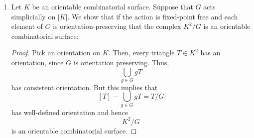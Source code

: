 \documentclass{book}
\begin{document}
\begin{enumerate}[(1)]
    \item Let $K$ be an orientable combinatorial surface. Suppose that $G$ acts simplicially on $|K|$. We show that if the action is fixed-point free and each element of $G$ is orientation-preserving that the complex $K^2/G$ is an orientable combinatorial surface:
        \begin{proof} Pick an orientation on $K$. Then, every triangle $T \in K^2$ has an orientation, since $G$ is orientation preserving. Thus, 
            \[\bigcup_{g \in G} gT\]
            has consistent orientation. But this implies that 
            \[[T] - \bigcup_{g \in G} gT = T/G\]
            has well-defined orientation and hence 
            \[K^2/G\]
            is an orientable combinatorial surface. 
        \end{proof}
\end{enumerate}
\end{document}
